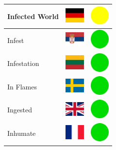 \documentclass[12pt, a4paper, twoside]{report}
\begin{document}
\begin{center}
\begin{longtable}{|p{5cm}|p{2cm}|p{2cm}|}
 Infected World                                             & \includegraphics[width=1cm]{../img/flags/de} &   \includegraphics[width=1cm]{../likes/m} \\ \hline
 Infest                                                     & \includegraphics[width=1cm]{../img/flags/rs} &   \includegraphics[width=1cm]{../likes/y} \\ \hline
 Infestation                                                & \includegraphics[width=1cm]{../img/flags/lt} &   \includegraphics[width=1cm]{../likes/y} \\ \hline
 In Flames                                                  & \includegraphics[width=1cm]{../img/flags/se} &   \includegraphics[width=1cm]{../likes/y} \\ \hline
 Ingested                                                   & \includegraphics[width=1cm]{../img/flags/gb} &   \includegraphics[width=1cm]{../likes/y} \\ \hline
 Inhumate                                                   & \includegraphics[width=1cm]{../img/flags/fr} &   \includegraphics[width=1cm]{../likes/y} \\ \hline

\end{longtable}
\end{center}
\end{document}

